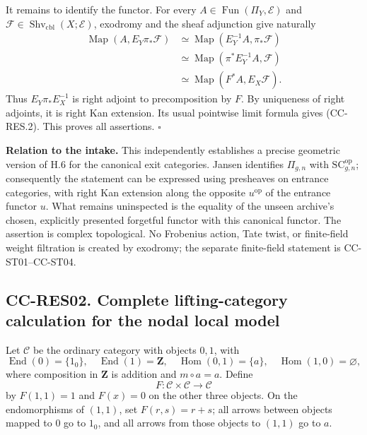 \documentclass[11pt,a4paper]{article}
\theoremstyle{definition}\newtheorem{definition}[theorem]{Definition}
\theoremstyle{remark}\newtheorem{remark}[theorem]{Remark}
\begin{document}
It remains to identify the functor. For every
\(A\in\operatorname{Fun}(\Pi_Y,\mathcal E)\) and
\(\mathcal F\in\operatorname{Shv}_{\mathrm{cbl}}(X;\mathcal E)\),
exodromy and the sheaf adjunction give naturally \[
\begin{aligned}
\operatorname{Map}(A,E_Y\pi_*\mathcal F)
&\simeq\operatorname{Map}(E_Y^{-1}A,\pi_*\mathcal F)\\
&\simeq\operatorname{Map}(\pi^*E_Y^{-1}A,\mathcal F)\\
&\simeq\operatorname{Map}(F^*A,E_X\mathcal F).
\end{aligned}
\] Thus \(E_Y\pi_*E_X^{-1}\) is right adjoint to precomposition by
\(F\). By uniqueness of right adjoints, it is right Kan extension. Its
usual pointwise limit formula gives (CC-RES.2). This proves all
assertions. \(\square\)

\textbf{Relation to the intake.} This independently establishes a
precise geometric version of H.6 for the canonical exit categories.
Jansen identifies \(\Pi_{g,n}\) with
\(\mathrm{SC}_{g,n}^{\mathrm{op}}\); consequently the statement can be
expressed using presheaves on entrance categories, with right Kan
extension along the opposite \(u^{\mathrm{op}}\) of the entrance functor
\(u\). What remains uninspected is the equality of the unseen archive's
chosen, explicitly presented forgetful functor with this canonical
functor. The assertion is complex topological. No Frobenius action, Tate
twist, or finite-field weight filtration is created by exodromy; the
separate finite-field statement is CC-ST01--CC-ST04.

\subsection{CC-RES02. Complete lifting-category calculation for the
nodal local
model}\label{cc-res02.-complete-lifting-category-calculation-for-the-nodal-local-model}

Let \(\mathcal C\) be the ordinary category with objects \(0,1\), with
\[
\operatorname{End}(0)=\{1_0\},\quad
\operatorname{End}(1)=\mathbf Z,\quad
\operatorname{Hom}(0,1)=\{a\},\quad
\operatorname{Hom}(1,0)=\varnothing,
\] where composition in \(\mathbf Z\) is addition and \(m\circ a=a\).
Define \[
F:\mathcal C\times\mathcal C\longrightarrow\mathcal C
\] by \(F(1,1)=1\) and \(F(x)=0\) on the other three objects. On the
endomorphisms of \((1,1)\), set \(F(r,s)=r+s\); all arrows between
objects mapped to 0 go to \(1_0\), and all arrows from those objects to
\((1,1)\) go to \(a\).
\end{document}
